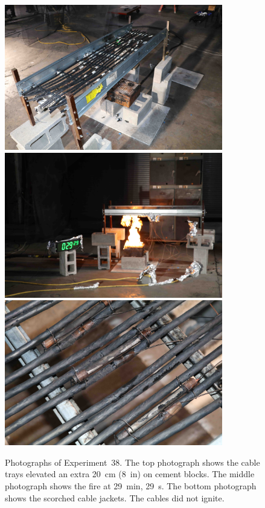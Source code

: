 \begin{figure}[p]
\centering
\includegraphics[height=2.50in]{../FIGURES/Test_38_setup} \\ \vspace{0.1in}
\includegraphics[height=2.50in]{../FIGURES/Test_38_29_min_29_s} \\ \vspace{0.1in}
\includegraphics[height=2.50in]{../FIGURES/Test_38_damage}
\caption[Photographs of Experiment~38]{Photographs of Experiment~38. The top photograph shows the cable trays elevated an extra 20~cm (8~in) on cement blocks. The middle photograph shows the fire at 29~min, 29~s. The bottom photograph shows the scorched cable jackets. The cables did not ignite.}
\label{fig:Test_38_photos}
\end{figure}


